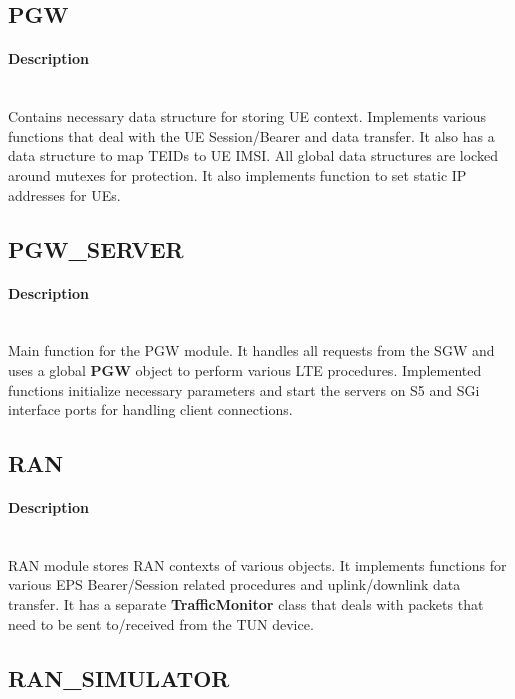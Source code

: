 \documentclass[hidelinks]{report}
\begin{document}
\subsection*{PGW}

\paragraph*{Description}

~\\ Contains necessary data structure for storing UE context. Implements various functions that deal with the UE Session/Bearer and data transfer. It also has a data structure to map TEIDs to UE IMSI. All global data structures are locked around mutexes for protection. It also implements function to set static IP addresses for UEs.

\subsection*{PGW\_SERVER}

\paragraph*{Description}

~\\ Main function for the PGW module. It handles all requests from the SGW and uses a global \textbf{PGW} object to perform various LTE procedures. Implemented functions initialize necessary parameters and start the servers on S5 and SGi interface ports for handling client connections.

\subsection*{RAN}

\paragraph*{Description}

~\\ RAN module stores RAN contexts of various objects. It implements functions for various EPS Bearer/Session related procedures and uplink/downlink data transfer. It has a separate \textbf{TrafficMonitor} class that deals with packets that need to be sent to/received from the TUN device.

\subsection*{RAN\_SIMULATOR}
\end{document}
